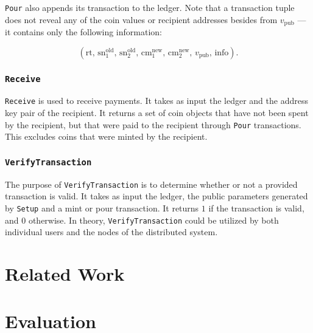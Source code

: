 \documentclass{article}
\begin{document}
\texttt{Pour} also appends its transaction to the ledger. Note that a transaction tuple does not reveal any of the coin values or recipient addresses besides from $v_{\text{pub}}$ --- it contains only the following information: 

\begin{equation}
\left(\text{rt}, \, {\text{sn}}^{\text{old}}_1, \, {\text{sn}}^{\text{old}}_2, \, {\text{cm}}^{\text{new}}_1, \, {\text{cm}}^{\text{new}}_2, \, v_{\text{pub}}, \, \text{info}\right).
\end{equation}

\subsubsection{\texttt{Receive}}
\texttt{Receive} is used to receive payments. It takes as input the ledger and the address key pair of the recipient. It returns a set of coin objects that have not been spent by the recipient, but that were paid to the recipient through \texttt{Pour} transactions. This excludes coins that were minted by the recipient.

\subsubsection{\texttt{VerifyTransaction}}
The purpose of \texttt{VerifyTransaction} is to determine whether or not a provided transaction is valid. It takes as input the ledger, the public parameters generated by \texttt{Setup} and a mint or pour transaction. It returns $1$ if the transaction is valid, and $0$ otherwise. In theory, \texttt{VerifyTransaction} could be utilized by both individual users and the nodes of the distributed system.

\section{Related Work}
\section{Evaluation}

\newpage
\printbibliography
\end{document}

